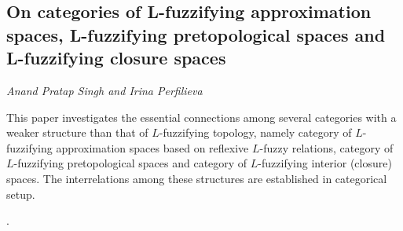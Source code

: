 \documentclass[../booklet.tex]{subfiles}
\begin{document}
\subsection[On categories of L-fuzzifying approximation spaces, L-fuzzifying pretopological spaces and L-fuzzifying closure spaces. {\it Anand Pratap Singh and Irina Perfilieva}]{On categories of L-fuzzifying approximation spaces, L-fuzzifying pretopological spaces and L-fuzzifying closure spaces}
 

\begin{center}
  {\it Anand Pratap Singh and Irina Perfilieva}
\end{center}



This paper investigates the essential connections among several categories with a weaker structure than that of $L$-fuzzifying topology, namely category of $L$-fuzzifying approximation spaces based on reflexive $L$-fuzzy relations, category of $L$-fuzzifying pretopological spaces and category of $L$-fuzzifying interior (closure) spaces. The interrelations among these structures are established in categorical setup.

.
\end{document}
